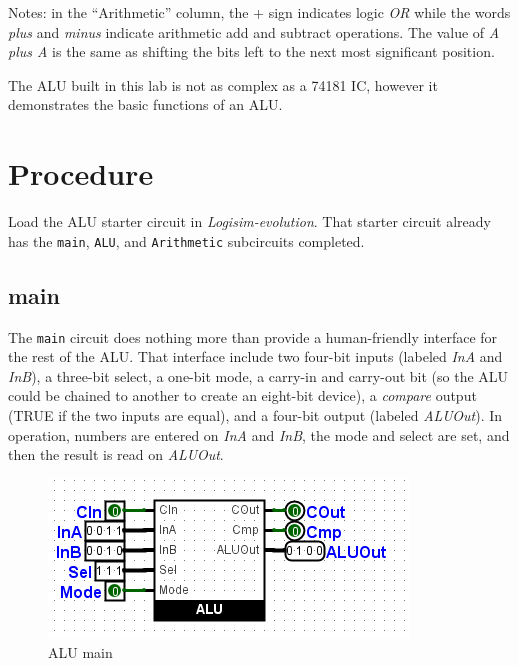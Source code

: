 Notes: in the ``Arithmetic'' column, the + sign indicates logic \textit{OR} while the words \textit{plus} and \textit{minus} indicate arithmetic add and subtract operations. The value of \textit{A plus A} is the same as shifting the bits left to the next most significant position.

The \ac{ALU} built in this lab is not as complex as a 74181 \ac{IC}, however it demonstrates the basic functions of an \ac{ALU}.

\section{Procedure}

Load the \ac{ALU} starter circuit in \textit{Logisim-evolution}. That starter circuit already has the \lstinline[columns=fixed]|main|, \lstinline[columns=fixed]|ALU|, and \lstinline[columns=fixed]|Arithmetic| subcircuits completed.

\subsection{main}

The \lstinline[columns=fixed]|main| circuit does nothing more than provide a human-friendly interface for the rest of the \ac{ALU}. That interface include two four-bit inputs (labeled \textit{InA} and \textit{InB}), a three-bit select, a one-bit mode, a carry-in and carry-out bit (so the \ac{ALU} could be chained to another to create an eight-bit device), a \textit{compare} output (TRUE if the two inputs are equal), and a four-bit output (labeled \textit{ALUOut}). In operation, numbers are entered on \textit{InA} and \textit{InB}, the mode and select are set, and then the result is read on \textit{ALUOut}.

\begin{figure}[H]
	\centering
	\includegraphics[width=\maxwidth{.95\linewidth}]{gfx/04-01}
	\caption{ALU main}
	\label{fig:04-01}
\end{figure}

